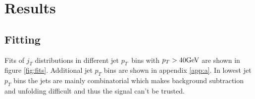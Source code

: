 \FloatBarrier
\section{Results}
\label{sec:exp}



%









\subsection{Fitting}
Fits of $j_T$ distributions in different jet $p_T$ bins with $p_T  > 40 \mathrm{GeV}\kern-0.05em$ are shown in figure \ref{fig:fits}. Additional jet $p_T$ bins are shown in appendix \ref{app:a}. In lowest jet $p_T$ bins the jets are mainly combinatorial which makes background subtraction and unfolding difficult and thus the signal can't be trusted. 

